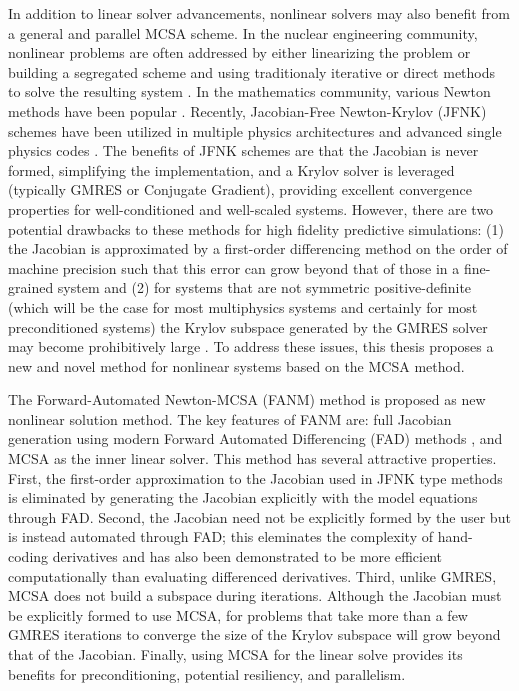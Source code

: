 In addition to linear solver advancements, nonlinear solvers may also
benefit from a general and parallel MCSA scheme. In the nuclear
engineering community, nonlinear problems are often addressed by
either linearizing the problem or building a segregated scheme and
using traditionaly iterative or direct methods to solve the resulting
system \citep{pletcher_computational_1997}. In the mathematics
community, various Newton methods have been popular
\citep{kelley_iterative_1995}. Recently, Jacobian-Free Newton-Krylov
(JFNK) schemes \citep{knoll_jacobian-free_2004} have been utilized in
multiple physics architectures and advanced single physics codes
\citep{gaston_parallel_2009}. The benefits of JFNK schemes are that
the Jacobian is never formed, simplifying the implementation, and a
Krylov solver is leveraged (typically GMRES or Conjugate Gradient),
providing excellent convergence properties for well-conditioned and
well-scaled systems. However, there are two potential drawbacks to
these methods for high fidelity predictive simulations: (1) the
Jacobian is approximated by a first-order differencing method on the
order of machine precision such that this error can grow beyond that
of those in a fine-grained system \citep{kelly_iterative_1995} and (2)
for systems that are not symmetric positive-definite (which will be
the case for most multiphysics systems and certainly for most
preconditioned systems) the Krylov subspace generated by the GMRES
solver may become prohibitively large
\citep{knoll_newton-krylov_1995}. To address these issues, this thesis
proposes a new and novel method for nonlinear systems based on the
MCSA method.

The Forward-Automated Newton-MCSA (FANM) method is proposed as new
nonlinear solution method. The key features of FANM are: full Jacobian
generation using modern Forward Automated Differencing (FAD) methods
\citep{bartlett_automatic_2006}, and MCSA as the inner linear
solver. This method has several attractive properties. First, the
first-order approximation to the Jacobian used in JFNK type methods is
eliminated by generating the Jacobian explicitly with the model
equations through FAD. Second, the Jacobian need not be explicitly
formed by the user but is instead automated through FAD; this
eleminates the complexity of hand-coding derivatives and has also been
demonstrated to be more efficient computationally than evaluating
differenced derivatives. Third, unlike GMRES, MCSA does not build a
subspace during iterations. Although the Jacobian must be explicitly
formed to use MCSA, for problems that take more than a few GMRES
iterations to converge the size of the Krylov subspace will grow
beyond that of the Jacobian. Finally, using MCSA for the linear solve
provides its benefits for preconditioning, potential resiliency, and
parallelism.

